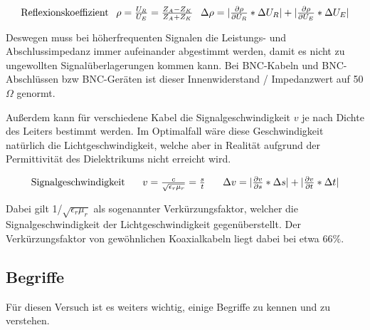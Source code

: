 \documentclass[12pt,a4paper,twoside]{article}
\begin{document}
\begin{equation}
    \label{eq:Reflexionskoeffizient}
    \centerline{Reflexionskoeffizient \\ $\rho = \frac{U_R}{U_E} = \frac{Z_A - Z_K}{Z_A + Z_K}$ \\ $\Delta \rho = \vert \frac{\partial \rho}{\partial U_R} * \Delta U_R \vert + \vert \frac{\partial \rho}{\partial U_E} * \Delta U_E \vert$}
\end{equation}

\noindent
Deswegen muss bei höherfrequenten Signalen die Leistungs- und Abschlussimpedanz immer aufeinander abgestimmt werden, damit es nicht zu ungewollten Signalüberlagerungen kommen kann.
Bei BNC-Kabeln und BNC-Abschlüssen bzw BNC-Geräten ist dieser Innenwiderstand / Impedanzwert auf 50 $\Omega$ genormt. \newline

\noindent
Außerdem kann für verschiedene Kabel die Signalgeschwindigkeit $v$ je nach Dichte des Leiters bestimmt werden.
Im Optimalfall wäre diese Geschwindigkeit natürlich die Lichtgeschwindigkeit, welche aber in Realität aufgrund der Permittivität des Dielektrikums nicht erreicht wird.

\begin{equation}
    \label{eq:Signalgeschwindigkeit}
    \centerline{Signalgeschwindigkeit \\ $v = \frac{c}{\sqrt{\epsilon_r \mu_r}} = \frac{s}{t}$ \\ $\Delta v = \vert \frac{\partial v}{\partial s} * \Delta s \vert + \vert \frac{\partial v}{\partial t} * \Delta t \vert $}
\end{equation}

\noindent
Dabei gilt 1/$\sqrt{\epsilon_r \mu_r}$ als sogenannter Verkürzungsfaktor, welcher die Signalgeschwindigkeit der Lichtgeschwindigkeit gegenüberstellt.
Der Verkürzungsfaktor von gewöhnlichen Koaxialkabeln liegt dabei bei etwa 66$\%$.

\subsection{Begriffe}

Für diesen Versuch ist es weiters wichtig, einige Begriffe zu kennen und zu verstehen.
\end{document}
